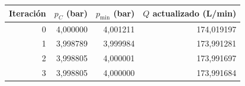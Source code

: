 \begin{tabular}{@{}rrrr@{}}
\toprule
Iteración & $p_C$ (bar) & $p_{\min}$ (bar) & $Q$ actualizado (L/min)\\\midrule
0 & 4{,}000000 & 4{,}001211 & 174{,}019197\\
1 & 3{,}998789 & 3{,}999984 & 173{,}991281\\
2 & 3{,}998805 & 4{,}000001 & 173{,}991697\\
3 & 3{,}998805 & 4{,}000000 & 173{,}991684\\
\bottomrule
\end{tabular}